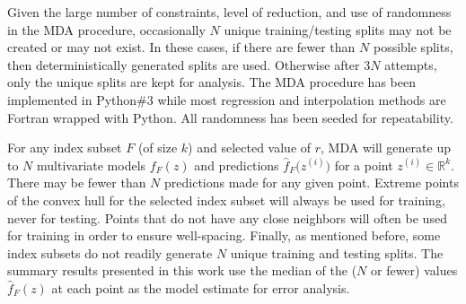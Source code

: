 \documentclass{scspaperproc}
\theoremstyle{scsthe}
\begin{document}
Given the large number of constraints, level of reduction, and use of
randomness in the MDA procedure, occasionally $N$ unique
training/testing splits may not be created or may not exist. In these
cases, if there are fewer than $N$ possible splits, then
deterministically generated splits are used. Otherwise after $3N$
attempts, only the unique splits are kept for analysis. The MDA
procedure has been implemented in Python\#3 while most regression and
interpolation methods are Fortran wrapped with Python. All randomness
has been seeded for repeatability.

For any index subset $F$ (of size $k$) and selected value of $r$, MDA
will generate up to $N$ multivariate models $f_F(z)$ and predictions
$\hat{f}_F\big(z^{(i)}\big)$ for a point $z^{(i)} \in \mathbb{R}^k$.
There may be fewer than $N$ predictions made for any given
point. Extreme points of the convex hull for the selected index subset
will always be used for training, never for testing. Points that do
not have any close neighbors will often be used for training in order
to ensure well-spacing. Finally, as mentioned before, some index
subsets do not readily generate $N$ unique training and testing
splits. The summary results presented in this work use the median of
the ($N$ or fewer) values $\hat{f}_F(z)$ at each point as the model
estimate for error analysis.



\end{document}
